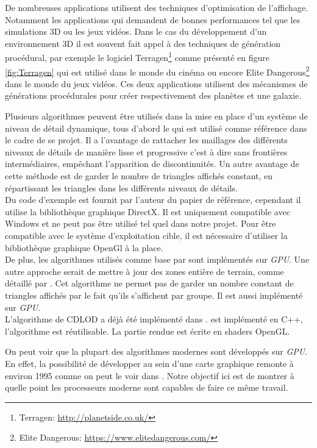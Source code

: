 \documentclass[12pt]{report}
\begin{document}
De nombreuses applications utilisent des techniques d'optimisation de
l'affichage. Notamment les applications qui demandent de bonnes
performances tel que les simulations 3D ou les jeux vidéos.
Dans le cas du développement d'un environnement 3D il est souvent fait
appel à des techniques de génération procédural, par exemple le logiciel
Terragen\footnote{Terragen: \url{http://planetside.co.uk/}} comme
présenté en figure \ref{fig:Terragen} qui est utilisé dans le monde du
cinéma ou encore Elite Dangerous\footnote{Elite Dangerous:
\url{https://www.elitedangerous.com/}} dans le monde du jeux vidéos.
Ces deux applications utilisent des mécanismes de générations procédurales
pour créer respectivement des planètes et une galaxie.

Plusieurs algorithmes peuvent être utilisés dans la mise en place d'un
système de niveau de détail dynamique, tous d'abord le \cite{CDLOD} qui
est utilisé comme référence dans le cadre de se projet.  Il a l'avantage
de rattacher les maillages des différents niveaux de détails de manière
lisse et progressive c'est à dire sans frontières intermédiaires,
empêchant l'apparition de discontinuités.  Un autre avantage de cette
méthode est de garder le nombre de triangles affichés constant, en
répartissant les triangles dans les différents niveaux de détails.\\
Du code d'exemple est fournit par l'auteur du papier de référence,
cependant il utilise la bibliothèque graphique DirectX. Il est
uniquement compatible avec Windows et ne peut pas être utilisé tel quel
dans notre projet.  Pour être compatible avec le système d'exploitation
cible, il est nécessaire d'utiliser la bibliothèque graphique OpenGl à la
place. \\
De plus, les algorithmes utilisés comme base par \cite{CDLOD} sont
implémentés sur \emph{GPU}. Une autre approche serait de mettre à jour
des zones entière de terrain, comme détaillé par \cite{MassiveTerrain}.
Cet algorithme ne permet pas de garder un nombre constant de triangles
affichés par le fait qu'ils s'affichent par groupe. Il est aussi
implémenté sur \emph{GPU}.\\
L'algorithme de CDLOD a déjà été implémenté dans \cite{WorldGenerator}.
\cite{WorldGenerator} est implémenté en C++, l'algorithme est
réutilisable. La partie rendue est écrite en shaders OpenGL.

On peut voir que la plupart des algorithmes modernes sont développés
sur \emph{GPU}.  En effet, la possibilité de développer au sein d'une
carte graphique remonte à environ 1995 comme on peut le voir dans
\cite{EvoGPU}. Notre objectif ici est de montrer à quelle point les
processeurs moderne sont capables de faire ce même travail.
\end{document}
